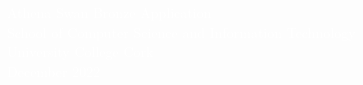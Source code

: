 \setcounter{tocdepth}{1}
\tableofcontents






\thispagestyle{empty}
\null\newpage 
\pagecolor{darkOrange}
\thispagestyle{empty}

\begingroup
\sffamily
\vspace*{18cm}
\textcolor{white}{
Athena Swan Bronze Application\\
School of Computer Science and Information Technology\\
University College Cork\\
December 2022
}
\endgroup 



